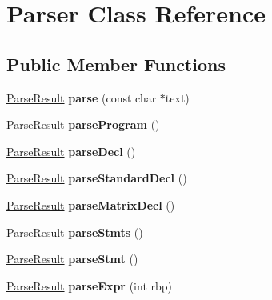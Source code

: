\hypertarget{class_parser}{}\section{Parser Class Reference}
\label{class_parser}
\subsection*{Public Member Functions}
\begin{DoxyCompactItemize}
\item 
\hypertarget{class_parser_a2c1a7aa0b09a43bc1eef460817efb1d6}{}\hyperlink{class_parse_result}{Parse\+Result} {\bfseries parse} (const char $\ast$text)\label{class_parser_a2c1a7aa0b09a43bc1eef460817efb1d6}

\item 
\hypertarget{class_parser_a14e25c84322809e2f060dc530362ea71}{}\hyperlink{class_parse_result}{Parse\+Result} {\bfseries parse\+Program} ()\label{class_parser_a14e25c84322809e2f060dc530362ea71}

\item 
\hypertarget{class_parser_ac646227983887c1cd13dae67fa1bc142}{}\hyperlink{class_parse_result}{Parse\+Result} {\bfseries parse\+Decl} ()\label{class_parser_ac646227983887c1cd13dae67fa1bc142}

\item 
\hypertarget{class_parser_a1e1f83c0f4b11148a356d951f191425e}{}\hyperlink{class_parse_result}{Parse\+Result} {\bfseries parse\+Standard\+Decl} ()\label{class_parser_a1e1f83c0f4b11148a356d951f191425e}

\item 
\hypertarget{class_parser_a3a00df25fda2af308b69f05eed14ac69}{}\hyperlink{class_parse_result}{Parse\+Result} {\bfseries parse\+Matrix\+Decl} ()\label{class_parser_a3a00df25fda2af308b69f05eed14ac69}

\item 
\hypertarget{class_parser_a452db3def31683cb0305e57a01489bd4}{}\hyperlink{class_parse_result}{Parse\+Result} {\bfseries parse\+Stmts} ()\label{class_parser_a452db3def31683cb0305e57a01489bd4}

\item 
\hypertarget{class_parser_a9709c4793d0cce012d595f3ee416cd25}{}\hyperlink{class_parse_result}{Parse\+Result} {\bfseries parse\+Stmt} ()\label{class_parser_a9709c4793d0cce012d595f3ee416cd25}

\item 
\hypertarget{class_parser_a50227dc24dc7a175ac0533d9957dfcf8}{}\hyperlink{class_parse_result}{Parse\+Result} {\bfseries parse\+Expr} (int rbp)\label{class_parser_a50227dc24dc7a175ac0533d9957dfcf8}


\end{DoxyCompactItemize}
